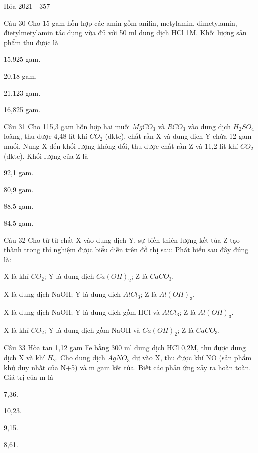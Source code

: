 \documentclass{book}
\begin{document}
\begin{quiz}{Hóa 2021 - 357}
\begin{multi}[points=1]{Câu 30}
 Cho 15 gam hỗn hợp các amin gồm anilin, metylamin, đimetylamin, đietylmetylamin tác dụng vừa đủ với 50 ml dung dịch HCl 1M. Khối lượng sản phẩm thu được là

\item  15,925 gam.	
\item  20,18 gam.	
\item  21,123 gam.	
\item*  16,825 gam.
\end{multi}

\begin{multi}[points=1]{Câu 31}
 Cho 115,3 gam hỗn hợp hai muối $MgCO_3$ và $RCO_3$ vào dung dịch $H_2SO_4$ loãng, thu được 4,48 lít khí $CO_2$ (đktc), chất rắn X và dung dịch Y chứa 12 gam muối. Nung X đến khối lượng không đổi, thu được chất rắn Z và 11,2 lít khí $CO_2$ (đktc). Khối lượng của Z là

\item  92,1 gam.	
\item  80,9 gam.	
\item*  88,5 gam.	
\item  84,5 gam.
\end{multi}

\begin{multi}[points=1]{Câu 32}
 Cho từ từ chất X vào dung dịch Y, sự biến thiên lượng kết tủa Z tạo thành trong thí nghiệm được biểu diễn trên đồ thị sau:         
Phát biểu sau đây đúng là: 

\item  X là khí $CO_2$; Y là dung dịch $Ca(OH)_2$; Z là $CaCO_3$.	
\item  X là dung dịch NaOH; Y là dung dịch $AlCl_3$; Z là $Al(OH)_3$.	
\item  X là dung dịch NaOH; Y là dung dịch gồm HCl và $AlCl_3$; Z là $Al(OH)_3$.	
\item*  X là khí $CO_2$; Y là dung dịch gồm NaOH và $Ca(OH)_2$; Z là $CaCO_3$.
\end{multi}

\begin{multi}[points=1]{Câu 33}
 Hòa tan 1,12 gam Fe bằng 300 ml dung dịch HCl 0,2M, thu được dung dịch X và khí $H_2$. Cho dung dịch $AgNO_3$ dư vào X, thu được khí NO (sản phẩm khử duy nhất của N+5) và m gam kết tủa. Biết các phản ứng xảy ra hoàn toàn. Giá trị của m là

\item  7,36.	
\item  10,23.	
\item*  9,15.	
\item  8,61.
\end{multi}


\end{quiz}
\end{document}
